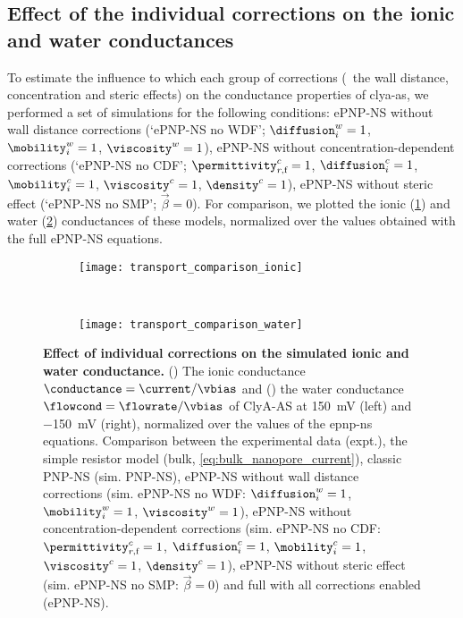 \subsection{Effect of the individual corrections on the ionic and water conductances}
%
\label{sec:transport:comparison_corrections}
%

To estimate the influence to which each group of corrections (\ie~the wall distance, concentration and steric
effects) on the conductance properties of \gls{clya-as}, we performed a set of simulations for the following
conditions: {ePNP-NS} without wall distance corrections (`ePNP-NS no WDF'; $\diffusion_{i}^w=1$,
$\mobility_{i}^w=1$, $\viscosity^w=1$), {ePNP-NS} without concentration-dependent corrections (`ePNP-NS no
CDF'; $\permittivity_{r,\text{f}}^c=1$, $\diffusion_{i}^c=1$, $\mobility_{i}^c=1$, $\viscosity^c=1$,
$\density^c=1$), {ePNP-NS} without steric effect (`ePNP-NS no SMP'; $\vec{\beta}=0$). For comparison, we
plotted the ionic (\cref{fig:transport_comparison_ionic}) and water (\cref{fig:transport_comparison_water})
conductances of these models, normalized over the values obtained with the full {ePNP-NS} equations.

%
\begin{figure*}[p]
  \centering
  \begin{subfigure}[t]{11.5cm}
    \centering
    \caption{}\vspace{0mm}\label{fig:transport_comparison_ionic}
    \texttt{[image: transport\_comparison\_ionic]}
  \end{subfigure}
  \\
  \begin{subfigure}[t]{11.5cm}
    \centering
    \caption{}\vspace{0mm}\label{fig:transport_comparison_water}
    \texttt{[image: transport\_comparison\_water]}
  \end{subfigure}

  \caption[Effect of individual corrections on the simulated ionic and water conductance.]%
  {%
    \textbf{Effect of individual corrections on the simulated ionic and water conductance.}
    ()
    The ionic conductance $\conductance = \current / \vbias$ and
    ()
    the water conductance $\flowcond = \flowrate / \vbias$ of {ClyA-AS} at \SI{+150}{\mV} (left) and
    \SI{-150}{\mV} (right), normalized over the values of the \gls{epnp-ns} equations. Comparison between the
    experimental data (expt.), the simple resistor model (bulk, \cref{eq:bulk_nanopore_current}), classic
    {PNP-NS} ({sim. PNP-NS}), {ePNP-NS} without wall distance corrections ({sim. ePNP-NS no WDF}:
    $\diffusion_{i}^w=1$, $\mobility_{i}^w=1$, $\viscosity^w=1$), {ePNP-NS} without concentration-dependent
    corrections ({sim. ePNP-NS no CDF}: $\permittivity_{r,\text{f}}^c=1$, $\diffusion_{i}^c=1$,
    $\mobility_{i}^c=1$, $\viscosity^c=1$, $\density^c=1$), {ePNP-NS} without steric effect ({sim. ePNP-NS no
    SMP}: $\vec{\beta}=0$) and full with all corrections enabled ({ePNP-NS}).
  }\label{fig:transport_comparison}
\end{figure*}
%

